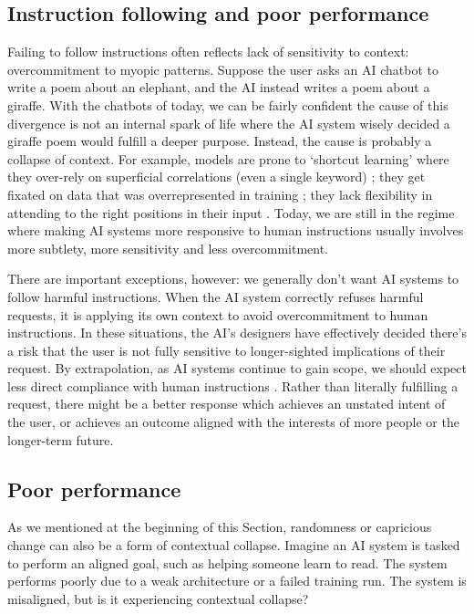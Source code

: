 \documentclass[12pt]{article}
\begin{document}
\subsection{Instruction following and poor performance}

Failing to follow instructions often reflects lack of sensitivity to context: overcommitment to myopic patterns. Suppose the user asks an AI chatbot to write a poem about an elephant, and the AI instead writes a poem about a giraffe. With the chatbots of today, we can be fairly confident the cause of this divergence is not an internal spark of life where the AI system wisely decided a giraffe poem would fulfill a deeper purpose. Instead, the cause is probably a collapse of context. For example, models are prone to `shortcut learning' where they over-rely on superficial correlations (even a single keyword) \citep{geirhos2020shortcut}; they get fixated on data that was overrepresented in training \citep{zhao2021calibrate,reynolds2021prompt,xu2024knowledge}; they lack flexibility in attending to the right positions in their input \citep{liu2024lost}. Today, we are still in the regime where making AI systems more responsive to human instructions usually involves more subtlety, more sensitivity and less overcommitment. 

There are important exceptions, however: we generally don't want AI systems to follow harmful instructions. When the AI system correctly refuses harmful requests, it is applying its own context to avoid overcommitment to human instructions. In these situations, the AI's designers have effectively decided there's a risk that the user is not fully sensitive to longer-sighted implications of their request. By extrapolation, as AI systems continue to gain scope, we should expect less direct compliance with human instructions \citep{hadfieldmenell2016cooperative,bostrom2014superintelligence,russell2019human, milli2017should, yudkowsky2004coherent}. Rather than literally fulfilling a request, there might be a better response which achieves an unstated intent of the user, or achieves an outcome aligned with the interests of more people or the longer-term future.

\subsection{Poor performance}

As we mentioned at the beginning of this Section, randomness or capricious change can also be a form of contextual collapse. Imagine an AI system is tasked to perform an aligned goal, such as helping someone learn to read. The system performs poorly due to a weak architecture or a failed training run. The system is misaligned, but is it experiencing contextual collapse?
\end{document}
